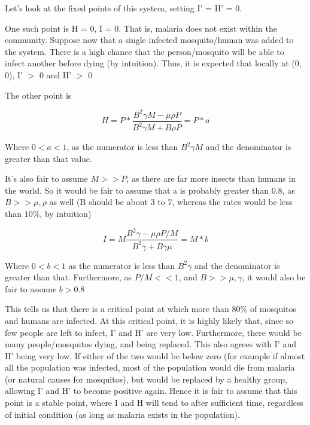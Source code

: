 \documentclass{article}
\begin{document}
Let's look at the fixed points of this system, setting I' = H' = 0. 

One such point is H = 0, I = 0. That is, malaria does not exist within the community. Suppose now that a single infected mosquito/human was added to the system. There is a high chance that the person/mosquito will be able to infect another before dying (by intuition). Thus, it is expected that locally at (0, 0), I' $>$ 0 and H' $>$ 0

The other point is 

$$H = P* \frac{B^2\gamma M - \mu \rho P }{B^2 \gamma M + B \rho P} = P*a$$

Where $0 < a < 1$, as the numerator is less than $B^2 \gamma M$ and the denominator is greater than that value.

It's also fair to assume $M  >> P$, as there are far more insects than humans in the world. So it would be fair to assume that a is probably greater than 0.8, as $B >> \mu , \rho$ as well (B should be about 3 to 7, whereas the rates would be less than $10\%$, by intuition) 

$$I = M \frac{B^2\gamma - \mu \rho P/M }{B^2 \gamma + B \gamma \mu} = M*b$$

Where $0 < b < 1$ as the numerator is less than $B^2 \gamma$ and the denominator is greater than that. Furthermore, as $P/M << 1$, and $B >> \mu, \gamma$, it would also be fair to assume $b > 0.8$

This tells us that there is a critical point at which more than $80\%$ of mosquitos and humans are infected. At this critical point, it is highly likely that, since so few people are left to infect, I' and H' are very low. Furthermore, there would be many people/mosquitos dying, and being replaced. This also agrees with I' and H' being very low. If either of the two would be below zero (for example if almost all the population was infected, most of the population would die from malaria (or natural causes for mosquitos), but would be replaced by a healthy group, allowing I' and H' to become positive again. Hence it is fair to assume that this point is a stable point, where I and H will tend to after sufficient time, regardless of initial condition (as long as malaria exists in the population).
 
\end{document}
